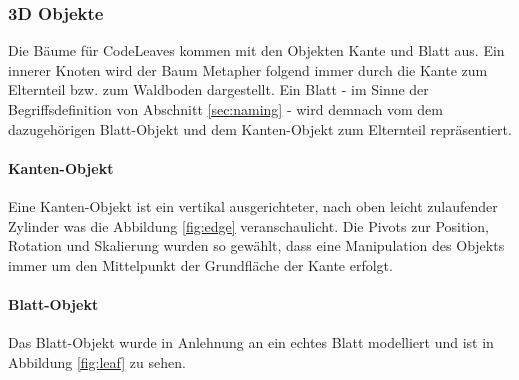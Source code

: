 \subsubsection*{3D Objekte}

Die Bäume für CodeLeaves kommen mit den Objekten Kante und Blatt aus. Ein innerer Knoten wird der Baum Metapher folgend immer durch die Kante zum Elternteil bzw. zum Waldboden dargestellt. Ein Blatt - im Sinne der Begriffsdefinition von Abschnitt \ref{sec:naming} - wird demnach vom dem dazugehörigen Blatt-Objekt und dem Kanten-Objekt zum Elternteil repräsentiert.

\paragraph{Kanten-Objekt} Eine Kanten-Objekt ist ein vertikal ausgerichteter, nach oben leicht zulaufender Zylinder was die Abbildung \ref{fig:edge} veranschaulicht. Die Pivots zur Position, Rotation und Skalierung wurden so gewählt, dass eine Manipulation des Objekts immer um den Mittelpunkt der Grundfläche der Kante erfolgt.\\

\paragraph{Blatt-Objekt} Das Blatt-Objekt wurde in Anlehnung an ein echtes Blatt modelliert und ist in Abbildung \ref{fig:leaf} zu sehen.\\

